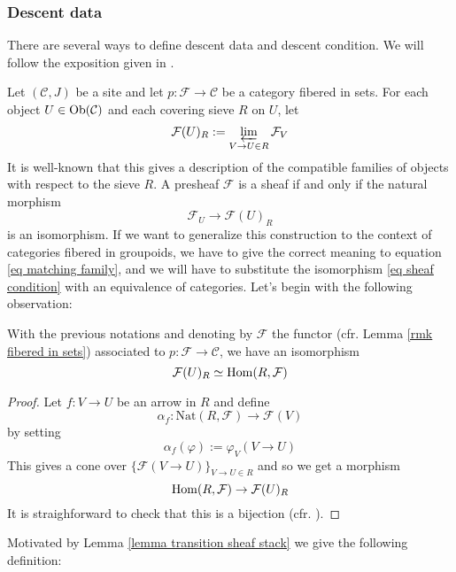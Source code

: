 \subsubsection*{Descent data}

There are several ways to define descent data and descent condition. We will follow the exposition given in \cite[Ch. 4]{vistoli}.

Let $(\mathcal C, J)$ be a site and let $p \colon \mathcal F \to \mathcal C$ be a category fibered in sets. For each object $U \in \mathrm{Ob}(\mathcal C)$ and each covering sieve $R$ on $U$, let
\begin{equation} \label{eq matching family}
\mathcal F(U)_R := \varprojlim_{V \to U \in R} \mathcal F_V
\end{equation}
It is well-known that this gives a description of the compatible families of objects with respect to the sieve $R$. A presheaf $\mathcal F$ is a sheaf if and only if the natural morphism
\begin{equation} \label{eq sheaf condition}
\mathcal F_U \to \mathcal F(U)_R
\end{equation}
is an isomorphism. If we want to generalize this construction to the context of categories fibered in groupoids, we have to give the correct meaning to equation \eqref{eq matching family}, and we will have to substitute the isomorphism \eqref{eq sheaf condition} with an equivalence of categories. Let's begin with the following observation:

\begin{lemma} \label{lemma transition sheaf stack}
With the previous notations and denoting by $\mathcal F$ the functor (cfr. Lemma \ref{rmk fibered in sets}) associated to $p \colon \mathcal F \to \mathcal C$, we have an isomorphism
\[
\mathcal F(U)_R \simeq \mathrm{Hom}(R,\mathcal F)
\]
\end{lemma}

\begin{proof}
Let $f \colon V \to U$ be an arrow in $R$ and define
\[
\alpha_f \colon \mathrm{Nat}(R, \mathcal F) \to \mathcal F(V)
\]
by setting
\[
\alpha_f(\varphi) := \varphi_V(V \to U)
\]
This gives a cone over $\{\mathcal F(V \to U)\}_{V \to U \in R}$ and so we get a morphism
\[
\mathrm{Hom}(R,\mathcal F) \to \mathcal F(U)_R
\]
It is straighforward to check that this is a bijection (cfr. \cite[Prop. 2.39]{vistoli}).
\end{proof}

Motivated by Lemma \ref{lemma transition sheaf stack} we give the following definition:

